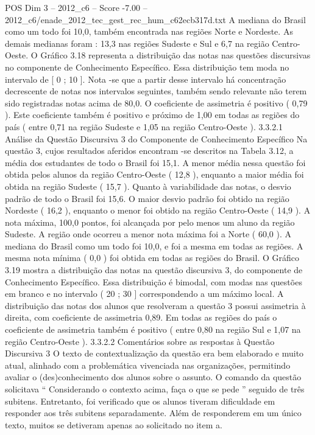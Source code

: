 \begin{textsample}{POS Dim 3 – 2012\_c6 – Score -7.00 – 2012\_c6/enade\_2012\_tec\_gest\_rec\_hum\_c62ecb317d.txt}
A mediana do Brasil como um todo foi 10,0, também encontrada nas regiões Norte e Nordeste.
As demais medianas foram : 13,3 nas regiões Sudeste e Sul e 6,7 na região Centro-Oeste.
O Gráfico 3.18 representa a distribuição das notas nas questões discursivas no componente de Conhecimento Específico.
Essa distribuição tem moda no intervalo de [ 0 ; 10 ].
Nota -se que a partir desse intervalo há concentração decrescente de notas nos intervalos seguintes, também sendo relevante não terem sido registradas notas acima de 80,0.
O coeficiente de assimetria é positivo ( 0,79 ).
Este coeficiente também é positivo e próximo de 1,00 em todas as regiões do país ( entre 0,71 na região Sudeste e 1,05 na região Centro-Oeste ). 3.3.2.1 Análise da Questão Discursiva 3 do Componente de Conhecimento Específico Na questão 3, cujos resultados aferidos encontram -se descritos na Tabela 3.12, a média dos estudantes de todo o Brasil foi 15,1.
A menor média nessa questão foi obtida pelos alunos da região Centro-Oeste ( 12,8 ), enquanto a maior média foi obtida na região Sudeste ( 15,7 ).
Quanto à variabilidade das notas, o desvio padrão de todo o Brasil foi 15,6.
O maior desvio padrão foi obtido na região Nordeste ( 16,2 ), enquanto o menor foi obtido na região Centro-Oeste ( 14,9 ).
A nota máxima, 100,0 pontos, foi alcançada por pelo menos um aluno da região Sudeste.
A região onde ocorreu a menor nota máxima foi a Norte ( 60,0 ).
A mediana do Brasil como um todo foi 10,0, e foi a mesma em todas as regiões.
A mesma nota mínima ( 0,0 ) foi obtida em todas as regiões do Brasil.
O Gráfico 3.19 mostra a distribuição das notas na questão discursiva 3, do componente de Conhecimento Específico.
Essa distribuição é bimodal, com modas nas questões em branco e no intervalo ( 20 ; 30 ] correspondendo a um máximo local.
A distribuição das notas dos alunos que resolveram a questão 3 possui assimetria à direita, com coeficiente de assimetria 0,89.
Em todas as regiões do país o coeficiente de assimetria também é positivo ( entre 0,80 na região Sul e 1,07 na região Centro-Oeste ). 3.3.2.2 Comentários sobre as respostas à Questão Discursiva 3 O texto de contextualização da questão era bem elaborado e muito atual, alinhado com a problemática vivenciada nas organizações, permitindo avaliar o (des)conhecimento dos alunos sobre o assunto.
O comando da questão solicitava “ Considerando o contexto acima, faça o que se pede ” seguido de três subitens.
Entretanto, foi verificado que os alunos tiveram dificuldade em responder aos três subitens separadamente.
Além de responderem em um único texto, muitos se detiveram apenas ao solicitado no item a.

\end{textsample}
